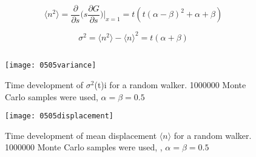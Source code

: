 \documentclass[10pt]{article}
\begin{document}
\begin{equation}
\langle n^2 \rangle = \frac{\partial}{\partial s} \Bigg( s\frac{\partial G}{\partial s} \Bigg) \Bigg|_{x=1} = t(t(\alpha - \beta)^2+\alpha + \beta)
\end{equation}

\begin{equation}
\sigma^2 = \langle n^2 \rangle - \langle n\rangle^2 = t(\alpha + \beta)
\end{equation}



\subsection{}
\begin{figure}
  \begin{center}
    \texttt{[image: 0505variance]}
    \caption {Time development of $\sigma^2$(t)i for a random walker. 1000000 Monte Carlo samples were used, $\alpha=\beta=0.5$}
    \label{fig:var}
  \end{center}
\end{figure}


\begin{figure}
  \begin{center}
    \texttt{[image: 0505displacement]}
    \caption {Time development of mean displacement $\langle n\rangle$ for a random walker. 1000000 Monte Carlo samples were used, , $\alpha=\beta=0.5$}
    \label{fig:displ}
  \end{center}
\end{figure}
\end{document}
